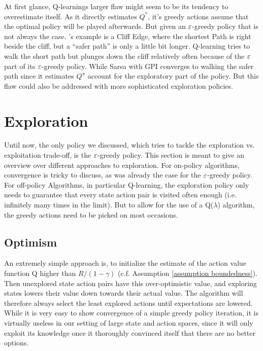 At first glance, Q-learnings larger flaw might seem to be its tendency to overestimate itself. As it directly estimates \(Q^*\), it's greedy actions assume that the optimal policy will be played afterwards. But given an \(\varepsilon\)-greedy policy that is not always the case. \citeauthor{suttonReinforcementLearningIntroduction1998}'s example is a Cliff Edge, where the shortest Path is right beside the cliff, but a ``safer path'' is only a little bit longer. Q-learning tries to walk the short path but plunges down the cliff relatively often because of the \(\varepsilon\) part of its \(\varepsilon\)-greedy policy. While Sarsa with GPI converges to walking the safer path since it estimates \(Q^\pi\) account for the exploratory part of the policy. But this flaw could also be addressed with more sophisticated exploration policies. 

\section{Exploration}\label{exploration}
Until now, the only policy we discussed, which tries to tackle the exploration vs. exploitation trade-off, is the \(\varepsilon\)-greedy policy. This section is meant to give an overview over different approaches to exploration. For on-policy algorithms, convergence is tricky to discuss, as was already the case for the \(\varepsilon\)-greedy policy. For off-policy Algorithms, in particular Q-learning, the exploration policy only needs to guarantee that every state action pair is visited often enough (i.e. infinitely many times in the limit).
But to allow for the use of a Q(\(\lambda\)) algorithm, the greedy actions need to be picked on most occasions. 


\subsection{Optimism}
An extremely simple approach is, to initialize the estimate of the action value function Q higher than \(R/(1-\gamma)\) (c.f. Assumption \ref{assumption boundedness}). Then unexplored state action pairs have this over-optimistic value, and exploring states lowers their value down towards their actual value. The algorithm will therefore always select the least explored actions until expectations are lowered. While it is very easy to show convergence of a simple greedy policy iteration, it is virtually useless in our setting of large state and action spaces, since it will only exploit its knowledge once it thoroughly convinced itself that there are no better options. 

